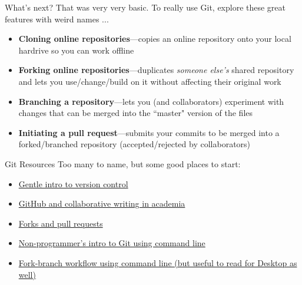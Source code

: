 \documentclass[12pt, compress]{beamer} %
\let\noteitem\item %
\renewcommand{\item}{ 
	\noteitem\vspace{\fill}
	}
\newcommand{\nb}[1]{{\color{burntorange} {#1}}}
\begin{document}
	\begin{frame}{What's next?}
		That was very very basic. To really use Git, explore these great features with weird names ... 
		
		
		\small
		\begin{itemize}
			\item \textbf{\nb{Cloning} online repositories}---copies an online repository onto your local hardrive so you can work offline
			\item \textbf{\nb{Forking} online repositories}---duplicates \textit{someone else's} shared repository and lets you use/change/build on it without affecting their original work
			\item \textbf{\nb{Branching} a repository}---lets you (and collaborators) experiment with changes that can be merged into the ``master" version of the files
			\item \textbf{Initiating a \nb{pull request}}---submits your commits to be merged into a forked/branched repository (accepted/rejected by collaborators)
		\end{itemize}
	\end{frame}

	\begin{frame}{Git Resources}
	Too many to name, but some good places to start:
	\begin{itemize}
		\item \href{http://www.chronicle.com/blogs/profhacker/a-gentle-introduction-to-version-control/23064}{Gentle intro to version control}
		\item \href{https://www.hastac.org/blogs/harrisonm/2013/10/12/github-academia-and-collaborative-writing}{GitHub and collaborative writing in academia}
		\item \href{http://www.chronicle.com/blogs/profhacker/forks-and-pull-requests-in-github/47753}{Forks and pull requests}
		\item \href{http://blog.scottlowe.org/2015/01/14/non-programmer-git-intro/}{Non-programmer's intro to Git using command line}
		\item \href{http://blog.scottlowe.org/2015/01/27/using-fork-branch-git-workflow/}{Fork-branch workflow using command line (but useful to read for Desktop as well)}
	\end{itemize}
	\end{frame}

\end{document}
